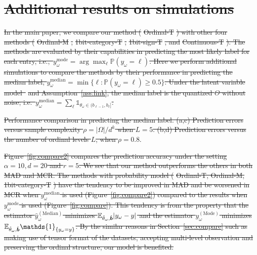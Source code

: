 \documentclass[11pt]{article}
\theoremstyle{plain}
\theoremstyle{definition}
\providecommand{\DIFdeltex}[1]{{\protect\color{red}\sout{#1}}}                      %
\providecommand{\DIFdelbegin}{} %
\providecommand{\DIFdelFL}[1]{\DIFdel{#1}} %
\providecommand{\DIFdel}[1]{\texorpdfstring{\DIFdeltex{#1}}{}} %
\begin{document}
\DIFdelbegin \section{\DIFdel{Additional results on simulations}}
\addtocounter{section}{-1}%
\DIFdel{In the main paper, we compare our method (}%
\DIFdel{Ordinal-T}%
\DIFdel{) with other four methods (}%
\DIFdel{Ordinal-M}%
\DIFdel{, }%
\DIFdel{1bit-category-T}%
\DIFdel{,}%
\DIFdel{1bit-sign-T}%
\DIFdel{, and }%
\DIFdel{Continuous-T}%
\DIFdel{). The methods are evaluated by their capabilities in predicting the most likely label for each entry, i.e.,\ $y_\omega^{\text{mode}}=\arg\max_\ell\mathbb{P}(y_\omega=\ell)$. Here we perform additional simulations to compare the methods by their performance in predicting the median label, $y_\omega^{\text{median}}=\min\{\ell\colon\mathbb{P}(y_\omega=\ell)\geq 0.5\}$. Under the latent variable model~}%
\DIFdel{and Assumption~\ref{ass:link}, the median label is the quantized $\Theta$ without noise; i.e.\ $y_\omega^{\text{median}}=\sum_\ell \mathds{1}_{\theta_\omega\in(b_{\ell-1},b_\ell]}$.
}%

{%
\DIFdelFL{Performance comparison in predicting the median label. (a,c) Prediction errors versus sample complexity $\rho=|\Omega|/d^k$ when $L=5$. (b,d) Prediction errors versus the number of ordinal levels $L$, when $\rho=0.8.$}}

\DIFdel{Figure~\ref{fig:compare2} compares the prediction accuracy under the setting $\alpha = 10, d = 20$ and $r = 5$. We see that our method outperforms the others in both MAD and MCR.  The methods with probability model (}%
\DIFdel{Ordinal-T, Ordinal-M, 1bit-category-T}%
\DIFdel{) have the tendency to be improved in MAD and be worsened in MCR when  $y_\omega^{\text{median}}$ is used (Figure~\ref{fig:compare2}) compared to the results when $y_\omega^{\text{mode}}$ is used (Figure~\ref{fig:compare}). This tendency is from the property that the estimator $\hat y^{(\text{Median})}_\omega$ minimizes $\mathbb{E}_{\hat{\theta}_\omega,\hat{\bm{b}}}|y_\omega-y|$
and the estimator $\hat y^{(\text{Mode})}_\omega $ minimizes $\mathbb{E}_{\hat{\theta}_\omega,\hat{\mb}}\mathds{1}_{\{y_\omega=y\}}$. By the similar reasons in Section~\ref{sec:compare} such as making use of tensor format of the datasets, accepting multi-level observation and preserving the ordinal structure, our model is benefited.
}%
\end{document}
